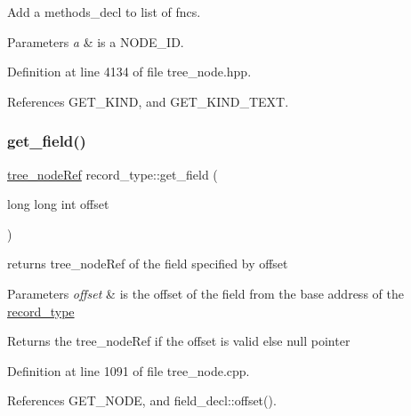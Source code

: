 Add a methods\+\_\+decl to list of fncs. 


\begin{DoxyParams}{Parameters}
{\em a} & is a N\+O\+D\+E\+\_\+\+ID. \\
\hline
\end{DoxyParams}


Definition at line 4134 of file tree\+\_\+node.\+hpp.



References G\+E\+T\+\_\+\+K\+I\+ND, and G\+E\+T\+\_\+\+K\+I\+N\+D\+\_\+\+T\+E\+XT.

\mbox{\label{structrecord__type_a5ff87a2eae46bb0cf9981f21987cbde0}} 
\subsubsection{\texorpdfstring{get\+\_\+field()}{get\_field()}}
{\footnotesize\ttfamily \hyperlink{tree__node_8hpp_a6ee377554d1c4871ad66a337eaa67fd5}{tree\+\_\+node\+Ref} record\+\_\+type\+::get\+\_\+field (\begin{DoxyParamCaption}\item[{long long int}]{offset }\end{DoxyParamCaption})}



returns tree\+\_\+node\+Ref of the field specified by offset 


\begin{DoxyParams}{Parameters}
{\em offset} & is the offset of the field from the base address of the \hyperlink{structrecord__type}{record\+\_\+type} \\
\hline
\end{DoxyParams}
\begin{DoxyReturn}{Returns}
the tree\+\_\+node\+Ref if the offset is valid else null pointer 
\end{DoxyReturn}


Definition at line 1091 of file tree\+\_\+node.\+cpp.



References G\+E\+T\+\_\+\+N\+O\+DE, and field\+\_\+decl\+::offset().

